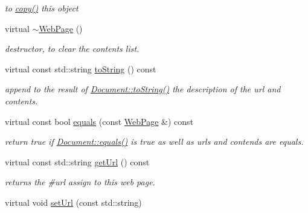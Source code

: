 \begin{DoxyCompactItemize}
\begin{DoxyCompactList}\small\item\em to \hyperlink{classdocs_1_1WebPage_a52ac0dc90ab3f5621d0fa41d8386806c}{copy()} this object \end{DoxyCompactList}\item 
\hypertarget{classdocs_1_1WebPage_a20af4ea1f7d488ae695b316a604ea6ad}{virtual \hyperlink{classdocs_1_1WebPage_a20af4ea1f7d488ae695b316a604ea6ad}{$\sim$\-Web\-Page} ()}\label{classdocs_1_1WebPage_a20af4ea1f7d488ae695b316a604ea6ad}

\begin{DoxyCompactList}\small\item\em destructor, to clear the contents list. \end{DoxyCompactList}\item 
\hypertarget{classdocs_1_1WebPage_ac3d747b84fa4e357791faab5994ccc22}{virtual const std\-::string \hyperlink{classdocs_1_1WebPage_ac3d747b84fa4e357791faab5994ccc22}{to\-String} () const }\label{classdocs_1_1WebPage_ac3d747b84fa4e357791faab5994ccc22}

\begin{DoxyCompactList}\small\item\em append to the result of \hyperlink{classdocs_1_1Document_a16db383045038b779eb489ad125ef02b}{Document\-::to\-String()} the description of the url and contents. \end{DoxyCompactList}\item 
\hypertarget{classdocs_1_1WebPage_aaced244fd624030e82026ba294282615}{virtual const bool \hyperlink{classdocs_1_1WebPage_aaced244fd624030e82026ba294282615}{equals} (const \hyperlink{classdocs_1_1WebPage}{Web\-Page} \&) const }\label{classdocs_1_1WebPage_aaced244fd624030e82026ba294282615}

\begin{DoxyCompactList}\small\item\em return true if \hyperlink{classdocs_1_1Document_ad86b3a7c7d496f3b05c740e2c1433c78}{Document\-::equals()} is true as well as urls and contends are equals. \end{DoxyCompactList}\item 
\hypertarget{classdocs_1_1WebPage_aaeac2076cad36b3dd2c3ea090e4712e0}{virtual const std\-::string \hyperlink{classdocs_1_1WebPage_aaeac2076cad36b3dd2c3ea090e4712e0}{get\-Url} () const }\label{classdocs_1_1WebPage_aaeac2076cad36b3dd2c3ea090e4712e0}

\begin{DoxyCompactList}\small\item\em returns the \#url assign to this web page. \end{DoxyCompactList}\item 
\hypertarget{classdocs_1_1WebPage_a46ae47ff938c8b9a4081c17b2c307ef9}{virtual void \hyperlink{classdocs_1_1WebPage_a46ae47ff938c8b9a4081c17b2c307ef9}{set\-Url} (const std\-::string)}\label{classdocs_1_1WebPage_a46ae47ff938c8b9a4081c17b2c307ef9}


\end{DoxyCompactItemize}
